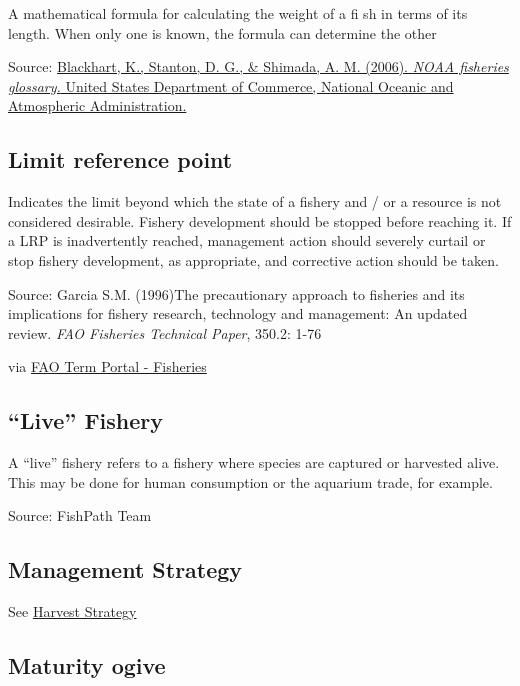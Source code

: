 \documentclass[
  11pt,
]{book}
\begin{document}
A mathematical formula for calculating the weight of a ﬁ sh in terms of its length. When only one is known, the formula can determine the other

Source: \href{https://repository.library.noaa.gov/view/noaa/12856}{Blackhart, K., Stanton, D. G., \& Shimada, A. M. (2006). \emph{NOAA fisheries glossary.} United States Department of Commerce, National Oceanic and Atmospheric Administration.}

\hypertarget{limit-reference-point}{%
\subsection{Limit reference point}\label{limit-reference-point}}

Indicates the limit beyond which the state of a fishery and / or a resource is not considered desirable. Fishery development should be stopped before reaching it. If a LRP is inadvertently reached, management action should severely curtail or stop fishery development, as appropriate, and corrective action should be taken.

Source: Garcia S.M. (1996)The precautionary approach to fisheries and its implications for fishery research, technology and management: An updated review. \emph{FAO Fisheries Technical Paper}, 350.2: 1-76

via \href{http://www.fao.org/fishery/glossary/en}{FAO Term Portal - Fisheries}

\hypertarget{live-fishery}{%
\subsection{``Live'' Fishery}\label{live-fishery}}

A ``live'' fishery refers to a fishery where species are captured or harvested alive. This may be done for human consumption or the aquarium trade, for example.

Source: FishPath Team

\hypertarget{management-strategy}{%
\subsection{Management Strategy}\label{management-strategy}}

See \protect\hyperlink{harvest-strategy}{Harvest Strategy}

\hypertarget{maturity-ogive}{%
\subsection{Maturity ogive}\label{maturity-ogive}}
\end{document}
